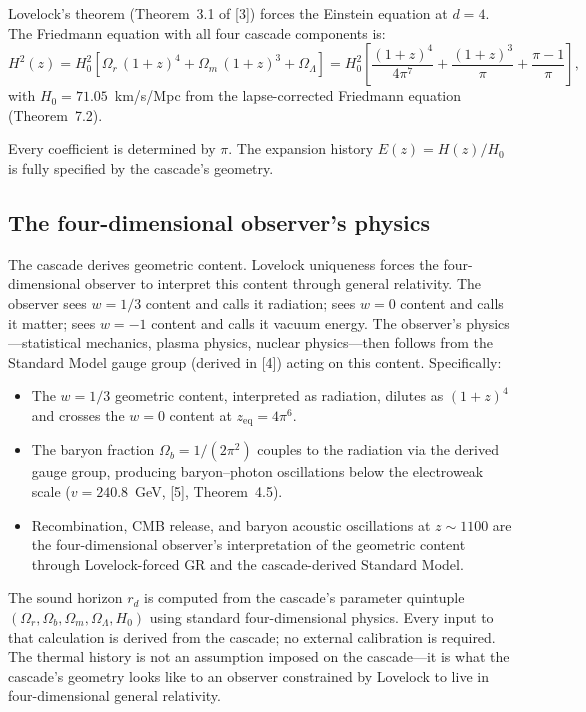 \documentclass[12pt,a4paper]{article}
\theoremstyle{remark}
\begin{document}
Lovelock's theorem (Theorem~3.1 of [3]) forces the Einstein equation at $d = 4$. The Friedmann equation with all four cascade components is:
\begin{equation}\label{eq:friedmann}
H^2(z) = H_0^2 \left[\Omega_r\,(1+z)^4 + \Omega_m\,(1+z)^3 + \Omega_\Lambda\right] = H_0^2\left[\frac{(1+z)^4}{4\pi^7} + \frac{(1+z)^3}{\pi} + \frac{\pi - 1}{\pi}\right],
\end{equation}
with $H_0 = 71.05$~km/s/Mpc from the lapse-corrected Friedmann equation (Theorem~7.2).

Every coefficient is determined by $\pi$. The expansion history $E(z) = H(z)/H_0$ is fully specified by the cascade's geometry.

\subsection{The four-dimensional observer's physics}

The cascade derives geometric content. Lovelock uniqueness forces the four-dimensional observer to interpret this content through general relativity. The observer sees $w = 1/3$ content and calls it radiation; sees $w = 0$ content and calls it matter; sees $w = -1$ content and calls it vacuum energy. The observer's physics---statistical mechanics, plasma physics, nuclear physics---then follows from the Standard Model gauge group (derived in [4]) acting on this content. Specifically:

\begin{itemize}[nosep]
\item The $w = 1/3$ geometric content, interpreted as radiation, dilutes as $(1+z)^4$ and crosses the $w = 0$ content at $z_{\mathrm{eq}} = 4\pi^6$.
\item The baryon fraction $\Omega_b = 1/(2\pi^2)$ couples to the radiation via the derived gauge group, producing baryon--photon oscillations below the electroweak scale ($v = 240.8$~GeV, [5], Theorem~4.5).
\item Recombination, CMB release, and baryon acoustic oscillations at $z \sim 1100$ are the four-dimensional observer's interpretation of the geometric content through Lovelock-forced GR and the cascade-derived Standard Model.
\end{itemize}

The sound horizon $r_d$ is computed from the cascade's parameter quintuple $(\Omega_r, \Omega_b, \Omega_m, \Omega_\Lambda, H_0)$ using standard four-dimensional physics. Every input to that calculation is derived from the cascade; no external calibration is required. The thermal history is not an assumption imposed on the cascade---it is what the cascade's geometry looks like to an observer constrained by Lovelock to live in four-dimensional general relativity.
\end{document}
